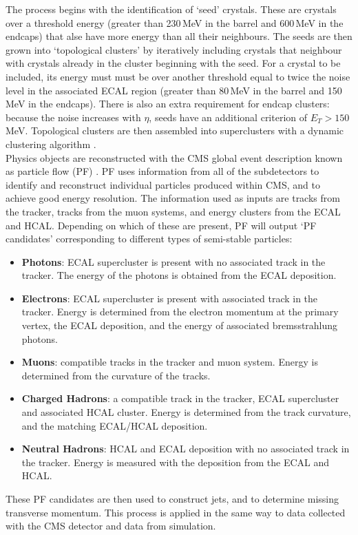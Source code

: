 The process \cite{CMSEcalTDR} begins with the identification of `seed' crystals. These are crystals over a threshold energy (greater than 230\,MeV in the barrel and 600\,MeV in the endcaps) that alse have more energy than all their neighbours.
The seeds are then grown into `topological clusters' by iteratively including crystals that neighbour with crystals already in the cluster beginning with the seed.
For a crystal to be included, its energy must must be over another threshold equal to twice the noise level in the associated ECAL region (greater than 80\,MeV in the barrel and 150\,MeV in the endcaps).
There is also an extra requirement for endcap clusters: because the noise increases with $\eta$, seeds have an additional criterion of $E_T > 150$\,MeV.
Topological clusters are then assembled into superclusters with a dynamic clustering algorithm \cite{CMSEcalTDR}.
\\

Physics objects are reconstructed with the CMS global event description known as particle flow (PF) \cite{ParticleFlow}.
PF uses information from all of the subdetectors to identify and reconstruct individual particles produced within CMS, and to achieve good energy resolution.
The information used as inputs are tracks from the tracker, tracks from the muon systems, and energy clusters from the ECAL and HCAL. Depending on which of these are present, PF will output `PF candidates' corresponding to different types of semi-stable particles:
\begin{itemize}[noitemsep]
    \item \textbf{Photons}: ECAL supercluster is present with no associated track in the tracker. 
                            The energy of the photons is obtained from the ECAL deposition. 
    \item \textbf{Electrons}: ECAL supercluster is present with associated track in the tracker. 
                              Energy is determined from the electron momentum at the primary vertex, the ECAL deposition, and the energy of associated bremsstrahlung photons. 
    \item \textbf{Muons}: compatible tracks in the tracker and muon system. 
                          Energy is determined from the curvature of the tracks. 
    \item \textbf{Charged Hadrons}: a compatible track in the tracker, ECAL supercluster and associated HCAL cluster. 
                                    Energy is determined from the track curvature, and the matching ECAL/HCAL deposition.
    \item \textbf{Neutral Hadrons}: HCAL and ECAL deposition with no associated track in the tracker. 
                                    Energy is measured with the deposition from the ECAL and HCAL. 
\end{itemize}
These PF candidates are then used to construct jets, and to determine missing transverse momentum.
This process is applied in the same way to data collected with the CMS detector and data from simulation.



